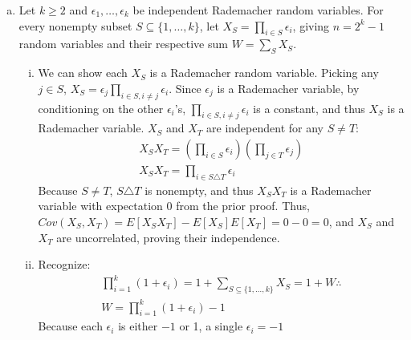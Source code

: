 \documentclass[11pt,a4paper,margin=1in]{article}
\begin{document}
\begin{enumerate}[(a)]
    This bound can not be improved in general. Let $\epsilon$ be a Rademacher
    random variable and let $X_i = \sigma_i \epsilon$. Then, we have:
    \begin{gather*}
        \sum_{i=1}^n X_i = \sum_{i=1}^n \sigma_i \epsilon = \left(\sum_{i=1}^n \sigma_i\right) \epsilon \therefore \\
        Var(S) = \left(\sum_{i=1}^n \sigma_i\right)^2
    \end{gather*}
    Any mean-zero random variable is $\sigma^2$-subgaussian if $\sigma^2 \geq Var(X)$, so
    $\sum_{i=1}^n X_i$ is $\left(\sum_{i=1}^n \sigma_i\right)^2$-subgaussian, and the bound
    cannot be improved in general.
    \item Let $k \geq 2$ and $\epsilon_1, \dots, \epsilon_k$ be independent Rademacher 
    random variables. For every nonempty subset $S \subseteq \{1, \dots, k\}$, let 
    $X_S = \prod_{i \in S} \epsilon_i$, giving $n = 2^k - 1$ random variables and
    their respective sum $W = \sum_S X_S$.
    \begin{enumerate}[i.]
        \item We can show each $X_S$ is a Rademacher random variable. Picking any
        $j \in S$, $X_S = \epsilon_j \prod_{i \in S, i \neq j} \epsilon_i$. Since 
        $\epsilon_j$ is a Rademacher variable, by conditioning on the other $\epsilon_i$'s, 
        $\prod_{i \in S, i \neq j} \epsilon_i$ is a constant, and thus $X_S$ is 
        a Rademacher variable. $X_S$ and $X_T$ are independent for any $S \neq T$:
        \begin{gather*}
            X_SX_T = \left(\prod_{i \in S} \epsilon_i\right)\left(\prod_{j \in T} \epsilon_j\right) \\
            X_SX_T = \prod_{i \in S \triangle T} \epsilon_i
        \end{gather*}
        Because $S \neq T$, $S \triangle T$ is nonempty, and thus $X_SX_T$ is a Rademacher
        variable with expectation 0 from the prior proof. Thus, $Cov(X_S, X_T) = E[X_SX_T] - E[X_S]E[X_T] = 0 - 0 = 0$, 
        and $X_S$ and $X_T$ are uncorrelated, proving their independence.
        \item Recognize:
        \begin{gather*}
            \prod_{i=1}^k (1 + \epsilon_i) = 1 + \sum_{S \subseteq \{1, \dots, k\}} X_S = 1 + W \therefore \\
            W = \prod_{i=1}^k (1 + \epsilon_i) - 1
        \end{gather*}
        Because each $\epsilon_i$ is either $-1$ or 1, a single $\epsilon_i = -1$ 

\end{enumerate}
\end{enumerate}
\end{document}
